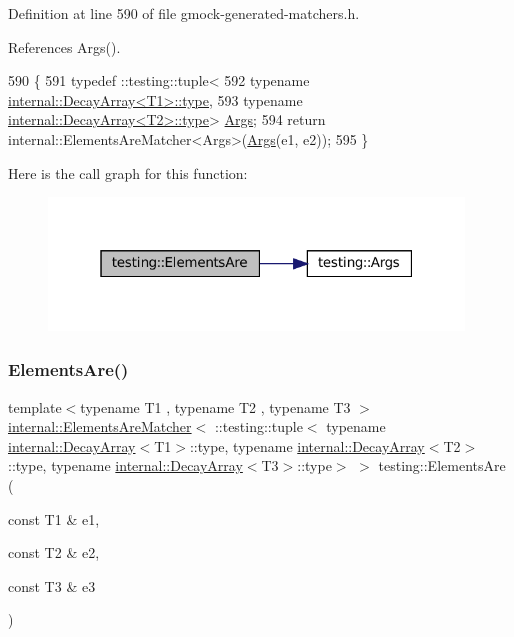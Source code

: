 Definition at line 590 of file gmock-\/generated-\/matchers.\+h.



References Args().


\begin{DoxyCode}
590                                         \{
591   typedef ::testing::tuple<
592       \textcolor{keyword}{typename} \hyperlink{namespacegenerate__debs_a50bc9a7ecac9584553e089a448bcde58}{internal::DecayArray<T1>::type},
593       \textcolor{keyword}{typename} \hyperlink{namespacegenerate__debs_a50bc9a7ecac9584553e089a448bcde58}{internal::DecayArray<T2>::type}> 
      \hyperlink{namespacetesting_a09ac462e8d6ed468cbfaa9c767aee0aa}{Args};
594   \textcolor{keywordflow}{return} internal::ElementsAreMatcher<Args>(\hyperlink{namespacetesting_a09ac462e8d6ed468cbfaa9c767aee0aa}{Args}(e1, e2));
595 \}
\end{DoxyCode}
Here is the call graph for this function\+:
\nopagebreak
\begin{figure}[H]
\begin{center}
\leavevmode
\includegraphics[width=313pt]{namespacetesting_a864f77fe7774308d4c54f1f52f9040cf_cgraph}
\end{center}
\end{figure}
\mbox{\label{namespacetesting_a0be8a0ad5d7461fd1da13ecac4e21e2a}} 
\subsubsection{\texorpdfstring{Elements\+Are()}{ElementsAre()}\hspace{0.1cm}{\footnotesize\ttfamily [4/11]}}
{\footnotesize\ttfamily template$<$typename T1 , typename T2 , typename T3 $>$ \\
\hyperlink{classtesting_1_1internal_1_1ElementsAreMatcher}{internal\+::\+Elements\+Are\+Matcher}$<$ \+::testing\+::tuple$<$ typename \hyperlink{structtesting_1_1internal_1_1DecayArray}{internal\+::\+Decay\+Array}$<$T1$>$\+::type, typename \hyperlink{structtesting_1_1internal_1_1DecayArray}{internal\+::\+Decay\+Array}$<$T2$>$\+::type, typename \hyperlink{structtesting_1_1internal_1_1DecayArray}{internal\+::\+Decay\+Array}$<$T3$>$\+::type$>$ $>$ testing\+::\+Elements\+Are (\begin{DoxyParamCaption}\item[{const T1 \&}]{e1,  }\item[{const T2 \&}]{e2,  }\item[{const T3 \&}]{e3 }\end{DoxyParamCaption})\hspace{0.3cm}{\ttfamily [inline]}}



